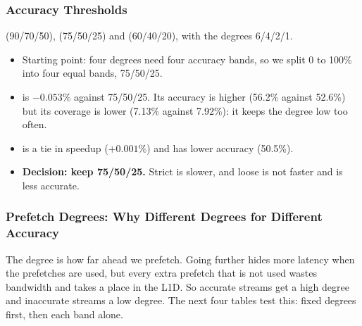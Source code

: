 \subsubsection{Accuracy Thresholds}
 (90/70/50),  (75/50/25) and  (60/40/20), with the degrees 6/4/2/1.
\tSw
{}\tAc
{}
\begin{itemize}
  \item Starting point: four degrees need four accuracy bands, so we split 0 to 100\% into four equal bands, 75/50/25.
  \item {} is $-0.053\%$ against 75/50/25. Its accuracy is higher (56.2\% against 52.6\%) but its coverage
        is lower (7.13\% against 7.92\%): it keeps the degree low too often.
  \item {} is a tie in speedup ($+0.001\%$) and has lower accuracy (50.5\%).
  \item \textbf{Decision: keep 75/50/25.} Strict is slower, and loose is not faster and is less accurate.
\end{itemize}

\subsubsection{Prefetch Degrees: Why Different Degrees for Different Accuracy}
The degree is how far ahead we prefetch. Going further hides more latency when the prefetches are used, but every
extra prefetch that is not used wastes bandwidth and takes a place in the L1D. So accurate streams get a high
degree and inaccurate streams a low degree. The next four tables test this: fixed degrees first, then each band alone.

